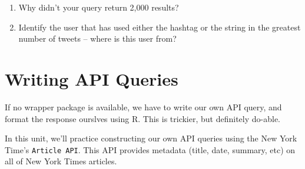 \documentclass[]{book}
\newenvironment{Shaded}{\begin{snugshade}}{\end{snugshade}}
\newcommand{\KeywordTok}[1]{\textcolor[rgb]{0.13,0.29,0.53}{\textbf{#1}}}
\newcommand{\DataTypeTok}[1]{\textcolor[rgb]{0.13,0.29,0.53}{#1}}
\newcommand{\DecValTok}[1]{\textcolor[rgb]{0.00,0.00,0.81}{#1}}
\newcommand{\StringTok}[1]{\textcolor[rgb]{0.31,0.60,0.02}{#1}}
\newcommand{\CommentTok}[1]{\textcolor[rgb]{0.56,0.35,0.01}{\textit{#1}}}
\newcommand{\OtherTok}[1]{\textcolor[rgb]{0.56,0.35,0.01}{#1}}
\newcommand{\OperatorTok}[1]{\textcolor[rgb]{0.81,0.36,0.00}{\textbf{#1}}}
\newcommand{\NormalTok}[1]{#1}
\begin{document}
\begin{enumerate}
\def\labelenumi{\arabic{enumi}.}
\item
  Why didn't your query return 2,000 results?
\item
  Identify the user that has used either the hashtag or the string in
  the greatest number of tweets -- where is this user from?
\end{enumerate}

\begin{Shaded}
\end{Shaded}

\hypertarget{writing-api-queries}{\section{Writing API
Queries}\label{writing-api-queries}}

If no wrapper package is available, we have to write our own API query,
and format the response ourslves using R. This is trickier, but
definitely do-able.

In this unit, we'll practice constructing our own API queries using the
New York Time's \texttt{Article\ API}. This API provides metadata
(title, date, summary, etc) on all of New York Times articles.
\end{document}

